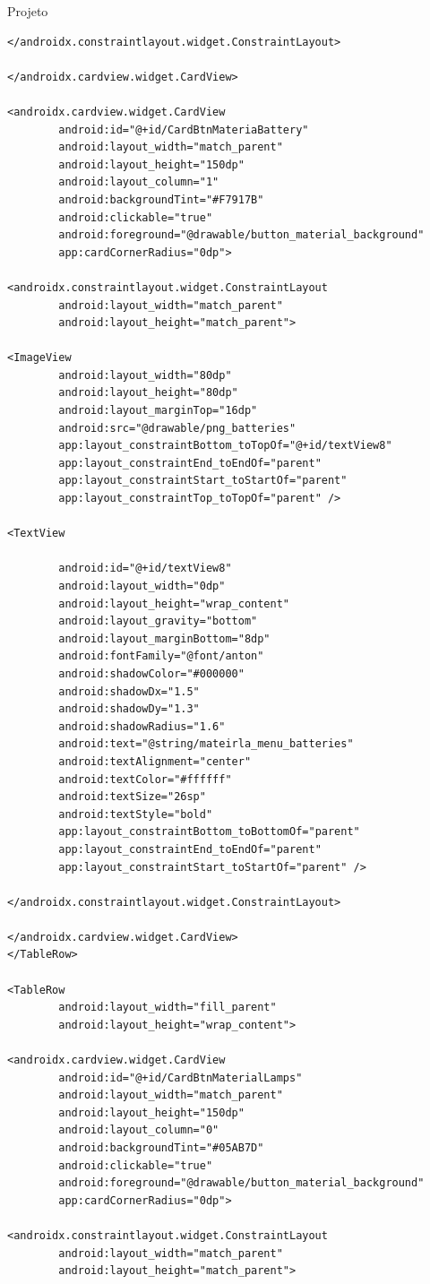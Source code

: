 \documentclass[
	12pt,				%
	openright,			%
	twoside,			%
	a4paper,			%
	english,			%
	french,				%
	spanish,			%
	brazil				%
	]{abntex2}
\begin{document}
\begin{chapter}{Projeto}
\begin{lstlisting}[numbers=none,basicstyle=\small,
caption={FragmentMaterialMenu.xml},
title={FragmentMaterialMenu.xml},
label={fragment_material_menu.xml}]
</androidx.constraintlayout.widget.ConstraintLayout>

</androidx.cardview.widget.CardView>

<androidx.cardview.widget.CardView
		android:id="@+id/CardBtnMateriaBattery"
		android:layout_width="match_parent"
		android:layout_height="150dp"
		android:layout_column="1"
		android:backgroundTint="#F7917B"
		android:clickable="true"
		android:foreground="@drawable/button_material_background"
		app:cardCornerRadius="0dp">

<androidx.constraintlayout.widget.ConstraintLayout
		android:layout_width="match_parent"
		android:layout_height="match_parent">

<ImageView
		android:layout_width="80dp"
		android:layout_height="80dp"
		android:layout_marginTop="16dp"
		android:src="@drawable/png_batteries"
		app:layout_constraintBottom_toTopOf="@+id/textView8"
		app:layout_constraintEnd_toEndOf="parent"
		app:layout_constraintStart_toStartOf="parent"
		app:layout_constraintTop_toTopOf="parent" />

<TextView

		android:id="@+id/textView8"
		android:layout_width="0dp"
		android:layout_height="wrap_content"
		android:layout_gravity="bottom"
		android:layout_marginBottom="8dp"
		android:fontFamily="@font/anton"
		android:shadowColor="#000000"
		android:shadowDx="1.5"
		android:shadowDy="1.3"
		android:shadowRadius="1.6"
		android:text="@string/mateirla_menu_batteries"
		android:textAlignment="center"
		android:textColor="#ffffff"
		android:textSize="26sp"
		android:textStyle="bold"
		app:layout_constraintBottom_toBottomOf="parent"
		app:layout_constraintEnd_toEndOf="parent"
		app:layout_constraintStart_toStartOf="parent" />

</androidx.constraintlayout.widget.ConstraintLayout>

</androidx.cardview.widget.CardView>
</TableRow>

<TableRow
		android:layout_width="fill_parent"
		android:layout_height="wrap_content">

<androidx.cardview.widget.CardView
		android:id="@+id/CardBtnMaterialLamps"
		android:layout_width="match_parent"
		android:layout_height="150dp"
		android:layout_column="0"
		android:backgroundTint="#05AB7D"
		android:clickable="true"
		android:foreground="@drawable/button_material_background"
		app:cardCornerRadius="0dp">

<androidx.constraintlayout.widget.ConstraintLayout
		android:layout_width="match_parent"
		android:layout_height="match_parent">


\end{lstlisting}
\end{chapter}
\end{document}
